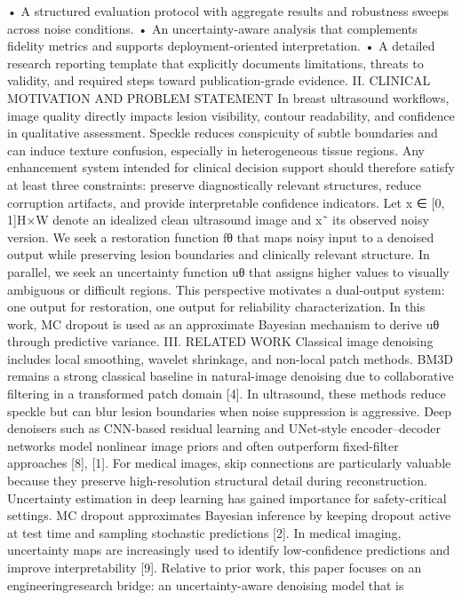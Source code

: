 • A structured evaluation protocol with aggregate results
and robustness sweeps across noise conditions.
• An uncertainty-aware analysis that complements fidelity
metrics and supports deployment-oriented interpretation.
• A detailed research reporting template that explicitly
documents limitations, threats to validity, and required
steps toward publication-grade evidence.
II. CLINICAL MOTIVATION AND PROBLEM STATEMENT
In breast ultrasound workflows, image quality directly impacts lesion visibility, contour readability, and confidence in
qualitative assessment. Speckle reduces conspicuity of subtle
boundaries and can induce texture confusion, especially in heterogeneous tissue regions. Any enhancement system intended
for clinical decision support should therefore satisfy at least
three constraints: preserve diagnostically relevant structures,
reduce corruption artifacts, and provide interpretable confidence indicators.
Let x ∈ [0, 1]H×W denote an idealized clean ultrasound
image and x˜ its observed noisy version. We seek a restoration
function fθ that maps noisy input to a denoised output while
preserving lesion boundaries and clinically relevant structure.
In parallel, we seek an uncertainty function uθ that assigns
higher values to visually ambiguous or difficult regions.
This perspective motivates a dual-output system: one output
for restoration, one output for reliability characterization. In
this work, MC dropout is used as an approximate Bayesian
mechanism to derive uθ through predictive variance.
III. RELATED WORK
Classical image denoising includes local smoothing, wavelet
shrinkage, and non-local patch methods. BM3D remains a
strong classical baseline in natural-image denoising due to
collaborative filtering in a transformed patch domain [4]. In
ultrasound, these methods reduce speckle but can blur lesion
boundaries when noise suppression is aggressive.
Deep denoisers such as CNN-based residual learning and UNet-style encoder–decoder networks model nonlinear image
priors and often outperform fixed-filter approaches [8], [1].
For medical images, skip connections are particularly valuable
because they preserve high-resolution structural detail during
reconstruction.
Uncertainty estimation in deep learning has gained importance for safety-critical settings. MC dropout approximates
Bayesian inference by keeping dropout active at test time and
sampling stochastic predictions [2]. In medical imaging, uncertainty maps are increasingly used to identify low-confidence
predictions and improve interpretability [9].
Relative to prior work, this paper focuses on an engineeringresearch bridge: an uncertainty-aware denoising model that is
